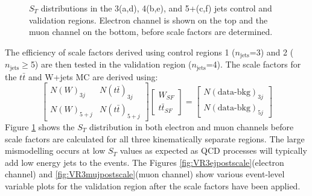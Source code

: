 \begin{figure}[h!]
\hfil   %
\caption{$S_T$ distributions in the 3(a,d), 4(b,e), and 5+(c,f) jets control and validation regions. Electron channel is shown on the top and the muon channel on the bottom, before scale factors are determined.}
\label{fig:CRSTs}
\end{figure}

The efficiency of scale factors derived using control regions 1 ($n_{\text{jets}}$=3) and 2 ($n_{\text{jets}}\geq$5) are then tested in the validation region ($n_{\text{jets}}$=4).  The scale factors for the $t\bar{t}$ and W+jets MC are derived using:
\[ 
\begin{bmatrix}  
N(W)_{3j} & N(t\bar{t})_{3j} \\ N(W)_{5+j} & N(t\bar{t})_{5+j} \end{bmatrix} \begin{bmatrix} W_{SF} \\ t\bar{t}_{SF} \end{bmatrix} =
 \begin{bmatrix} N(\text{data-bkg})_{3j} \\N(\text{data-bkg})_{5j} \end{bmatrix}
\]
Figure \ref{fig:CRSTs} shows the $S_T$ distribution in both electron and muon channels before scale factors are calculated for all three kinematically separate regions.  The large mismodelling occurs at low $S_T$ values as expected as QCD processes will typically add low energy jets to the events.  The  Figures \ref{fig:VR3ejpostscale}(electron channel) and \ref{fig:VR3mujpostscale}(muon channel) show various event-level variable plots for the validation region after the scale factors have been applied.

